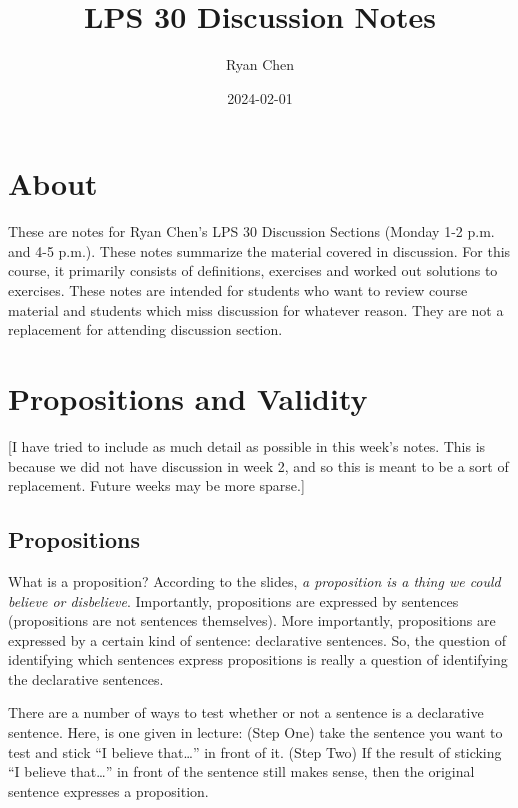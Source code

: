 \documentclass[
]{book}
\title{LPS 30 Discussion Notes}
\author{Ryan Chen}
\date{2024-02-01}
\begin{document}
\maketitle

{
\setcounter{tocdepth}{1}
\tableofcontents
}
\hypertarget{about}{%
\chapter{About}\label{about}}

These are notes for Ryan Chen's LPS 30 Discussion Sections (Monday 1-2 p.m. and 4-5 p.m.). These notes summarize the material covered in discussion. For this course, it primarily consists of definitions, exercises and worked out solutions to exercises. These notes are intended for students who want to review course material and students which miss discussion for whatever reason. They are not a replacement for attending discussion section.

\hypertarget{propositions-and-validity}{%
\chapter{Propositions and Validity}\label{propositions-and-validity}}

{[}I have tried to include as much detail as possible in this week's notes. This is because we did not have discussion in week 2, and so this is meant to be a sort of replacement. Future weeks may be more sparse.{]}

\hypertarget{propositions}{%
\section{Propositions}\label{propositions}}

What is a proposition? According to the slides, \emph{a proposition is a thing we could believe or disbelieve}. Importantly, propositions are expressed by sentences (propositions are not sentences themselves). More importantly, propositions are expressed by a certain kind of sentence: declarative sentences. So, the question of identifying which sentences express propositions is really a question of identifying the declarative sentences.

There are a number of ways to test whether or not a sentence is a declarative sentence. Here, is one given in lecture: (Step One) take the sentence you want to test and stick ``I believe that\ldots{}'' in front of it. (Step Two) If the result of sticking ``I believe that\ldots{}'' in front of the sentence still makes sense, then the original sentence expresses a proposition.
\end{document}
